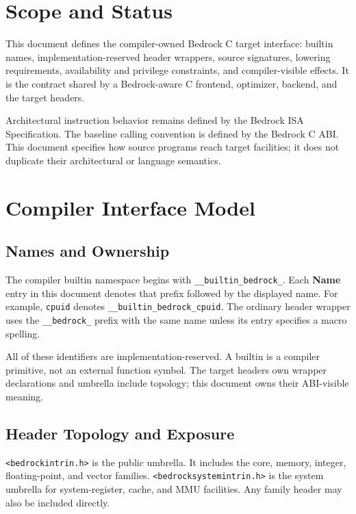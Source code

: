 \documentclass[10pt,twoside]{article}
\begin{document}
\BedrockDocumentHasFiguresfalse
\BedrockFrontMatter

\clearpage
\section{Scope and Status}\label{page:scope-and-status}
This document defines the compiler-owned Bedrock C target interface: builtin
names, implementation-reserved header wrappers, source signatures, lowering
requirements, availability and privilege constraints, and compiler-visible
effects. It is the contract shared by a Bedrock-aware C frontend, optimizer,
backend, and the target headers.

Architectural instruction behavior remains defined by the Bedrock ISA
Specification. The baseline calling convention is defined by the Bedrock C
ABI. This document specifies how source programs reach target facilities; it
does not duplicate their architectural or language semantics.


\section{Compiler Interface Model}\label{page:compiler-interface-model}

\subsection{Names and Ownership}
The compiler builtin namespace begins with
\texttt{\_\_builtin\_bedrock\_}. Each \textbf{Name} entry in this document
denotes that prefix followed by the displayed name. For example,
\texttt{cpuid} denotes
\texttt{\_\_builtin\_bedrock\_cpuid}. The ordinary header wrapper uses the
\texttt{\_\_bedrock\_} prefix with the same name unless its entry specifies a
macro spelling.

All of these identifiers are implementation-reserved. A builtin is a compiler
primitive, not an external function symbol. The target headers own wrapper
declarations and umbrella include topology; this document owns their
ABI-visible meaning.

\subsection{Header Topology and Exposure}
\texttt{<bedrockintrin.h>} is the public umbrella. It includes the core, memory,
integer, floating-point, and vector families. \texttt{<bedrocksystemintrin.h>} is the system
umbrella for system-register, cache, and MMU facilities. Any
family header may also be included directly.
\end{document}
